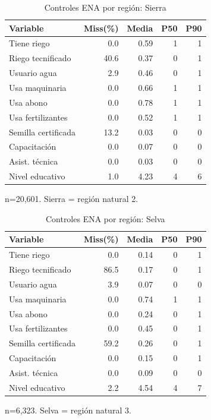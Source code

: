 \documentclass[11pt,a4paper]{article}
\begin{document}
\begin{table}[H]
\centering
\caption{Controles ENA por región: Sierra}
\label{tab:ena_controls_sierra}
\begin{threeparttable}
\small
\begin{tabular}{lrrrr}
\toprule
\textbf{Variable} & \textbf{Miss(\%)} & \textbf{Media} & \textbf{P50} & \textbf{P90} \\
\midrule
Tiene riego & 0.0 & 0.59 & 1 & 1 \\
Riego tecnificado & 40.6 & 0.37 & 0 & 1 \\
Usuario agua & 2.9 & 0.46 & 0 & 1 \\
Usa maquinaria & 0.0 & 0.66 & 1 & 1 \\
Usa abono & 0.0 & 0.78 & 1 & 1 \\
Usa fertilizantes & 0.0 & 0.52 & 1 & 1 \\
Semilla certificada & 13.2 & 0.03 & 0 & 0 \\
Capacitación & 0.0 & 0.07 & 0 & 0 \\
Asist. técnica & 0.0 & 0.03 & 0 & 0 \\
Nivel educativo & 1.0 & 4.23 & 4 & 6 \\
\bottomrule
\end{tabular}
\begin{tablenotes}
\footnotesize
\item n=20,601. Sierra = región natural 2.
\end{tablenotes}
\end{threeparttable}
\end{table}

\begin{table}[H]
\centering
\caption{Controles ENA por región: Selva}
\label{tab:ena_controls_selva}
\begin{threeparttable}
\small
\begin{tabular}{lrrrr}
\toprule
\textbf{Variable} & \textbf{Miss(\%)} & \textbf{Media} & \textbf{P50} & \textbf{P90} \\
\midrule
Tiene riego & 0.0 & 0.14 & 0 & 1 \\
Riego tecnificado & 86.5 & 0.17 & 0 & 1 \\
Usuario agua & 3.9 & 0.07 & 0 & 0 \\
Usa maquinaria & 0.0 & 0.74 & 1 & 1 \\
Usa abono & 0.0 & 0.24 & 0 & 1 \\
Usa fertilizantes & 0.0 & 0.45 & 0 & 1 \\
Semilla certificada & 59.2 & 0.26 & 0 & 1 \\
Capacitación & 0.0 & 0.15 & 0 & 1 \\
Asist. técnica & 0.0 & 0.09 & 0 & 0 \\
Nivel educativo & 2.2 & 4.54 & 4 & 7 \\
\bottomrule
\end{tabular}
\begin{tablenotes}
\footnotesize
\item n=6,323. Selva = región natural 3.
\end{tablenotes}
\end{threeparttable}
\end{table}
\end{document}
